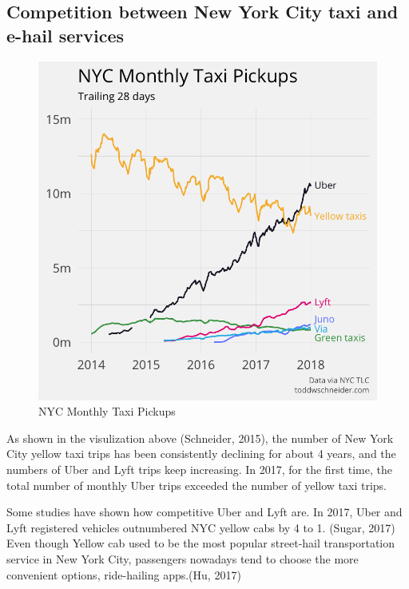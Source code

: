 \documentclass[12pt,twoside]{reedthesis}
\theoremstyle{definition}
\theoremstyle{definition}
\theoremstyle{definition}
\theoremstyle{remark}
\begin{document}
\subsection{Competition between New York City taxi and e-hail
services}\label{competition-between-new-york-city-taxi-and-e-hail-services}
\begin{figure}

{\centering \includegraphics[width=5.33in]{figure/totals_by_car_type} 

}

\caption{NYC Monthly Taxi Pickups}\label{fig:totals-by-car-type}
\end{figure}
As shown in the visulization above (Schneider, 2015), the number of New
York City yellow taxi trips has been consistently declining for about 4
years, and the numbers of Uber and Lyft trips keep increasing. In 2017,
for the first time, the total number of monthly Uber trips exceeded the
number of yellow taxi trips.

Some studies have shown how competitive Uber and Lyft are. In 2017, Uber
and Lyft registered vehicles outnumbered NYC yellow cabs by 4 to 1.
(Sugar, 2017) Even though Yellow cab used to be the most popular
street-hail transportation service in New York City, passengers nowadays
tend to choose the more convenient options, ride-hailing apps.(Hu, 2017)
\end{document}
